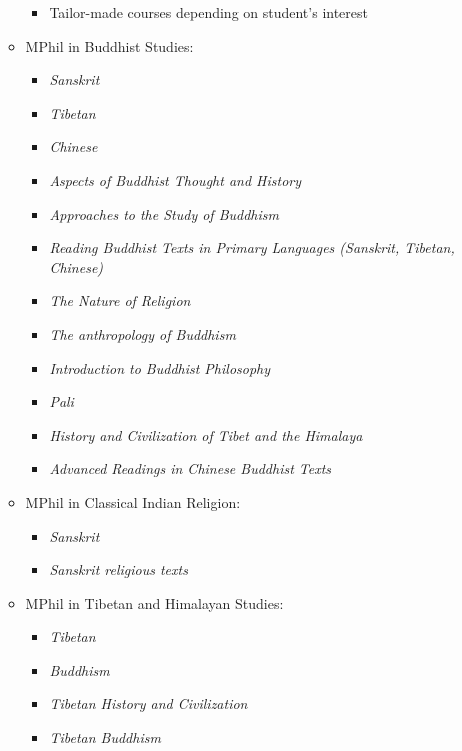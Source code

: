 \documentclass[a4paper,10.5pt]{article}
\begin{document}
\begin{enumerate}
\begin{itemize}
\begin{itemize}
\item Tailor-made courses depending on student’s interest\\
\end{itemize}
\item MPhil in Buddhist Studies:\\
\begin{itemize}
\item \emph{Sanskrit}\\
\item \emph{Tibetan}\\
\item \emph{Chinese}\\
\item \emph{Aspects of Buddhist Thought and History}\\
\item \emph{Approaches to the Study of Buddhism}\\
\item \emph{Reading Buddhist Texts in Primary Languages (Sanskrit, Tibetan, Chinese)}\\
\item \emph{The Nature of Religion}\\
\item \emph{The anthropology of Buddhism}\\
\item \emph{Introduction to Buddhist Philosophy}\\
\item \emph{Pali}\\
\item \emph{History and Civilization of Tibet and the Himalaya}\\
\item \emph{Advanced Readings in Chinese Buddhist Texts}\\
\end{itemize}
\item MPhil in Classical Indian Religion:\\
\begin{itemize}
\item \emph{Sanskrit}\\
\item \emph{Sanskrit religious texts}\\
\end{itemize}
\item MPhil in Tibetan and Himalayan Studies:\\
\begin{itemize}
\item \emph{Tibetan}\\
\item \emph{Buddhism}\\
\item \emph{Tibetan History and Civilization}\\
\item \emph{Tibetan Buddhism}\\
\end{itemize}
\end{itemize}
\end{enumerate}
\end{document}
